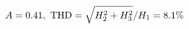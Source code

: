 \documentclass[preview]{standalone}
\begin{document}
\begin{align*}
\special{dvisvgm:raw <g id='unique000'>}A=0.41,\ \text{THD}=\sqrt{H_2^2+H_3^2}/H_1=8.1\%\special{dvisvgm:raw </g>}
\end{align*}
\end{document}
